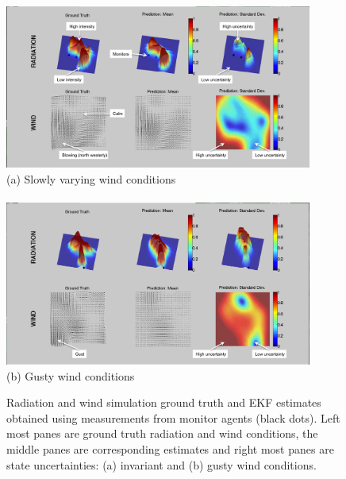 

\begin{figure}[ht] \begin{center}
    \includegraphics[width=0.90\textwidth]{figures/radiation_ss_calm_annotated.png}\\
    (a) Slowly varying wind conditions\\ \ \\
    \includegraphics[width=0.90\textwidth]{figures/radiation_ss_gust_annotated.png}\\
    (b) Gusty wind conditions 
\caption{\label{radiation_screen_shots} Radiation and wind simulation ground truth and EKF estimates obtained using measurements from monitor agents (black dots).  Left most panes are ground truth radiation and wind conditions, the middle panes are corresponding estimates and right most panes are state uncertainties:  (a) invariant and (b) gusty wind conditions.}
\end{center}
\end{figure}
